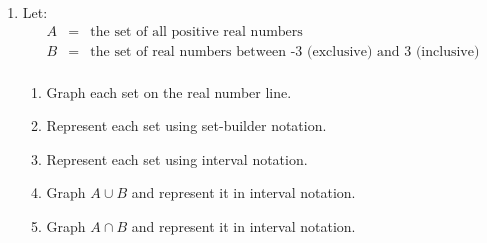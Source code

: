 \documentclass[letterpaper,12pt,fleqn]{article}
\begin{document}
\begin{enumerate}
\item Let:
\begin{eqnarray*}
A &=& \mbox{the set of all positive real numbers} \\
B &=& \mbox{the set of real numbers between -3 (exclusive) and 3 (inclusive)} \\
\end{eqnarray*}
\begin{enumerate}
\item Graph each set on the real number line.
\item Represent each set using set-builder notation.
\item Represent each set using interval notation.
\item Graph $A\cup B$ and represent it in interval notation.
\item Graph $A\cap B$ and represent it in interval notation.
\end{enumerate}

\end{enumerate}
\end{document}
